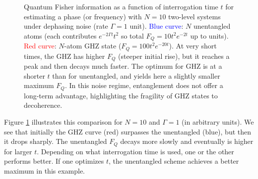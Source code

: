 \begin{figure}[tb]

\centering


\caption{Quantum Fisher information as a function of interrogation time $t$ for estimating a phase (or frequency) with $N=10$ two-level systems under dephasing noise (rate $\Gamma=1$ unit). \textcolor{blue}{Blue curve}: $N$ unentangled atoms (each contributes $e^{-2\Gamma t}t^2$ so total $F_Q = 10 t^2 e^{-2t}$ up to units). \textcolor{red}{Red curve}: $N$-atom GHZ state ($F_Q = 100 t^2 e^{-20 t}$). At very short times, the GHZ has higher $F_Q$ (steeper initial rise), but it reaches a peak and then decays much faster. The optimum for GHZ is at a shorter $t$ than for unentangled, and yields here a slightly smaller maximum $F_Q$. In this noise regime, entanglement does not offer a long-term advantage, highlighting the fragility of GHZ states to decoherence.}

\label{fig:GHZ-dephasing}

\end{figure}



Figure \ref{fig:GHZ-dephasing} illustrates this comparison for $N=10$
and $\Gamma=1$ (in arbitrary units). We see that initially the GHZ
curve (red) surpasses the unentangled (blue), but then it drops
sharply. The unentangled $F_Q$ decays more slowly and eventually is
higher for larger $t$. Depending on what interrogation time is used,
one or the other performs better. If one optimizes $t$, the
unentangled scheme achieves a better maximum in this example.



